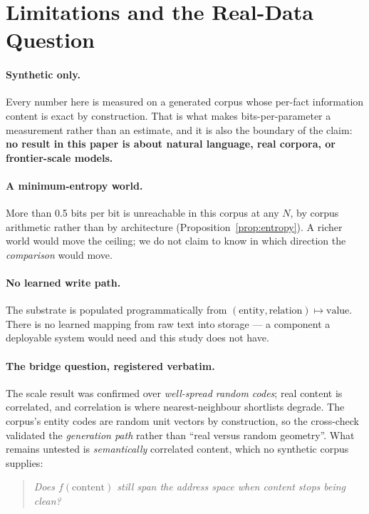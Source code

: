 \section{Limitations and the Real-Data Question}
\label{sec:limits}

\paragraph{Synthetic only.} Every number here is measured on a generated corpus whose per-fact
information content is exact by construction. That is what makes bits-per-parameter a measurement
rather than an estimate, and it is also the boundary of the claim: \textbf{no result in this paper
is about natural language, real corpora, or frontier-scale models.}

\paragraph{A minimum-entropy world.} More than 0.5 bits per bit is unreachable in this corpus at any
$N$, by corpus arithmetic rather than by architecture (Proposition~\ref{prop:entropy}). A richer
world would move the ceiling; we do not claim to know in which direction the \emph{comparison} would
move.

\paragraph{No learned write path.} The substrate is populated programmatically from
$(\text{entity}, \text{relation}) \mapsto \text{value}$. There is no learned mapping from raw text
into storage --- a component a deployable system would need and this study does not have.

\paragraph{The bridge question, registered verbatim.} The scale result was confirmed over
\emph{well-spread random codes}; real content is correlated, and correlation is where
nearest-neighbour shortlists degrade. The corpus's entity codes are random unit vectors by
construction, so the cross-check validated the \emph{generation path} rather than ``real versus
random geometry''. What remains untested is \emph{semantically} correlated content, which no
synthetic corpus supplies:

\begin{quote}
\textit{Does $f(\mathrm{content})$ still span the address space when content stops being clean?}
\end{quote}

